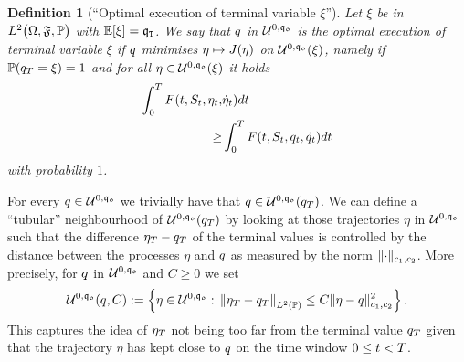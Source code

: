\documentclass[10pt,a4paper]{article}
\newtheorem{defi}[thm]{Definition}
\begin{document}
	\begin{defi}[``Optimal execution of terminal variable $\xi$'']\label{defi.optimalExecutionOfSpecifiedTerminalVariable}
		Let $\xi$ be in $\Ltwo \probabilitySpace$ with $\Expectation[\xi] = \liquidationTarget$. We say that $\inventory$ in $\spaceUnbiasedInventoryTrajectoriesInitialConstraint$ is the optimal execution of terminal variable $\xi$ if $\inventory$ minimises $\eta \mapsto \costFunctional(\eta)$ on $\spaceUnbiasedInventoryTrajectoriesInitialConstraint(\xi)$, namely if $ \Prob(\inventory_\timeHorizon =\xi)=1 $ and for all $\eta \in \spaceUnbiasedInventoryTrajectoriesInitialConstraint(\xi)$ it holds
		\begin{equation*}
		\begin{split}
		\intZeroTimeHorizon F(t,\fundamentalPrice_t,\eta_t,&\dotEta_t )dt \\
		\geq & \intZeroTimeHorizon F(t,\fundamentalPrice_t, \inventory_t ,\inventoryRate_t )dt
		\end{split}
		\end{equation*}
		with probability $1$.
	\end{defi}
	For every $\inventory \in \spaceUnbiasedInventoryTrajectoriesInitialConstraint$ we trivially have that $\inventory \in \spaceUnbiasedInventoryTrajectoriesInitialConstraint(\inventory_\timeHorizon)$. We can define a ``tubular'' neighbourhood of $\spaceUnbiasedInventoryTrajectoriesInitialConstraint(\inventory_\timeHorizon) $ by looking at those trajectories $\eta$ in $\spaceUnbiasedInventoryTrajectoriesInitialConstraint$ such that the difference $\eta_\timeHorizon - \inventory_\timeHorizon$ of the terminal values is controlled by the distance between the processes $\eta$ and $\inventory$ as measured by the norm $\normInventoryTrjectories{\cdot}$. More precisely, for $\inventory$ in $\spaceUnbiasedInventoryTrajectoriesInitialConstraint$ and $C\geq 0$ we set 
	\begin{equation}\label{eq.staticTubularNeighbourhoodIC}
	\spaceUnbiasedInventoryTrajectoriesInitialConstraint(\inventory,C):=
	\left\lbrace
	\eta \in \spaceUnbiasedInventoryTrajectoriesInitialConstraint: \, 
	\norm[\eta_\timeHorizon-\inventory_\timeHorizon ]_{\Ltwo(\Prob)} \leq 
	C \normInventoryTrjectories{\eta -\inventory}\squared 
	\right\rbrace.
	\end{equation}
	This captures the idea of $\eta_\timeHorizon$ not being too far from the terminal value $\inventory_\timeHorizon$ given that the trajectory $\eta$  has kept close to $\inventory$ on the time window $0\leq t<\timeHorizon$.
	
\end{document}
